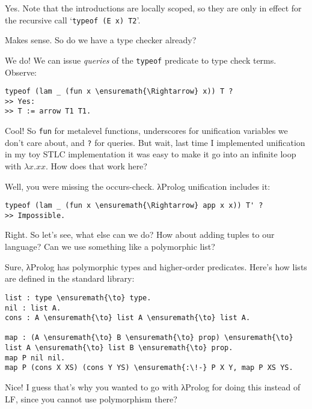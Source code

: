 \heroADVISOR{} Yes. Note that the introductions are locally scoped, so they
are only in effect for the recursive call `\texttt{typeof\ (E\ x)\ T2}'.

\heroSTUDENT{} Makes sense. So do we have a type checker already?

\heroADVISOR{} We do! We can issue \emph{queries} of the \texttt{typeof}
predicate to type check terms. Observe:

\importantCodeblock{}

\begin{verbatim}
typeof (lam _ (fun x \ensuremath{\Rightarrow} x)) T ?
>> Yes:
>> T := arrow T1 T1.
\end{verbatim}

\importantCodeblockEnd{}

\heroSTUDENT{} Cool! So \texttt{fun} for metalevel functions, underscores for
unification variables we don't care about, and \texttt{?} for queries.
But wait, last time I implemented unification in my toy STLC
implementation it was easy to make it go into an infinite loop with
\(\lambda x. x x\). How does that work here?

\heroADVISOR{} Well, you were missing the occurs-check. \foreignlanguage{greek}{λ}Prolog unification
includes it:

\begin{verbatim}
typeof (lam _ (fun x \ensuremath{\Rightarrow} app x x)) T' ?
>> Impossible.
\end{verbatim}

\heroSTUDENT{} Right. So let's see, what else can we do? How about adding
tuples to our language? Can we use something like a polymorphic list?

\heroADVISOR{} Sure, \foreignlanguage{greek}{λ}Prolog has polymorphic types and higher-order
predicates. Here's how lists are defined in the standard library:

\begin{verbatim}
list : type \ensuremath{\to} type.
nil : list A.
cons : A \ensuremath{\to} list A \ensuremath{\to} list A.

map : (A \ensuremath{\to} B \ensuremath{\to} prop) \ensuremath{\to} list A \ensuremath{\to} list B \ensuremath{\to} prop.
map P nil nil.
map P (cons X XS) (cons Y YS) \ensuremath{:\!-} P X Y, map P XS YS.
\end{verbatim}

\heroSTUDENT{} Nice! I guess that's why you wanted to go with \foreignlanguage{greek}{λ}Prolog for
doing this instead of LF, since you cannot use polymorphism there?

